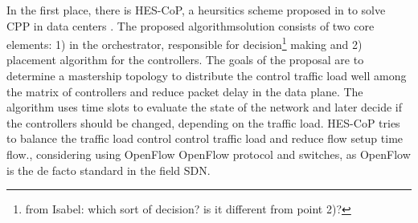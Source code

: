 \documentclass{IEEEtran}
\newcommand\fia[1]{{\color{red}\footnote{\color{red}from Isabel: #1}}} %
\newcommand\mia[1]{{\color{red}#1}}%
\newcommand\delia[1]{{\tiny{\color{red}#1}}} %
\begin{document}
\delia{In the first place, there is HES-CoP, a heursitics scheme proposed in \cite{WoLi15} to solve CPP in data centers} . The proposed \delia{algorithm}\mia{solution} consists of two core elements: 1) \delia{in} the orchestrator, responsible for decision\fia{which sort of decision? is it different from point 2)?} making and 2) placement algorithm for the controllers. The goals of the proposal are to determine a mastership topology to distribute the control traffic load well among the matrix of controllers and reduce packet delay in the data plane. The algorithm uses time slots to evaluate the state of the network and later decide if the controllers should be changed, depending on the traffic load. HES-CoP tries to balance the \delia{traffic load control} \mia{control traffic load} and reduce \mia{flow} setup time \delia{flow}.\delia{, considering using OpenFlow OpenFlow protocol and switches, as OpenFlow is the de facto standard in the field SDN.} %
\end{document}
